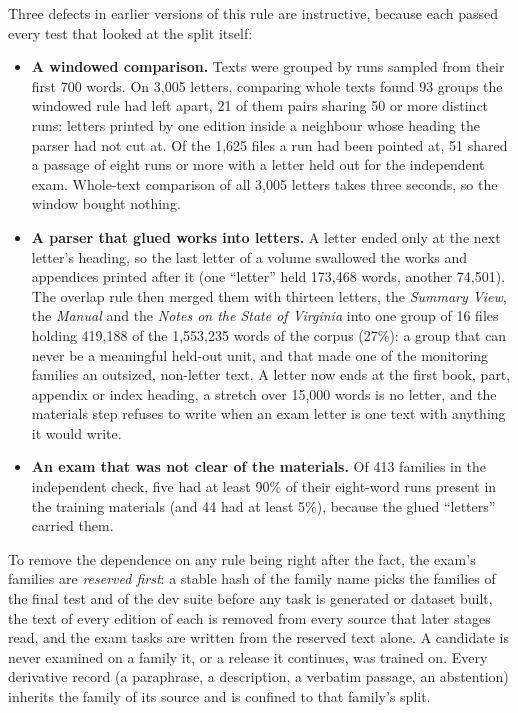 Three defects in earlier versions of this rule are instructive, because each passed every
test that looked at the split itself:
\begin{itemize}
\item \textbf{A windowed comparison.} Texts were grouped by runs sampled from their first
  700 words. On 3,005 letters, comparing whole texts found 93 groups the windowed rule had
  left apart, 21 of them pairs sharing 50 or more distinct runs: letters printed by one edition
  inside a neighbour whose heading the parser had not cut at. Of the 1,625 files a run had
  been pointed at, 51 shared a passage of eight runs or more with a letter held out for the
  independent exam. Whole-text comparison of all 3,005 letters takes three seconds, so the
  window bought nothing.
\item \textbf{A parser that glued works into letters.} A letter ended only at the next
  letter's heading, so the last letter of a volume swallowed the works and appendices printed
  after it (one ``letter'' held 173,468 words, another 74,501). The overlap rule then
  merged them with thirteen letters, the \emph{Summary View}, the \emph{Manual} and the
  \emph{Notes on the State of Virginia} into one group of 16 files holding 419,188 of the
  1,553,235 words of the corpus (27\%): a group that can never be a meaningful held-out
  unit, and that made one of the monitoring families an outsized, non-letter text. A letter
  now ends at the first book, part, appendix or index heading, a stretch over 15,000 words
  is no letter, and the materials step refuses to write when an exam letter is one text with
  anything it would write.
\item \textbf{An exam that was not clear of the materials.} Of 413 families in the
  independent check, five had at least 90\% of their eight-word runs present in the
  training materials (and 44 had at least 5\%), because the glued ``letters'' carried them.
\end{itemize}

To remove the dependence on any rule being right after the fact, the exam's families are
\emph{reserved first}: a stable hash of the family name picks the families of the final
test and of the dev suite before any task is generated or dataset built, the text of every
edition of each is removed from every source that later stages read, and the exam tasks are
written from the reserved text alone. A candidate is never examined on a family it, or a
release it continues, was trained on. Every derivative record (a paraphrase, a description,
a verbatim passage, an abstention) inherits the family of its source and is confined to that
family's split.

